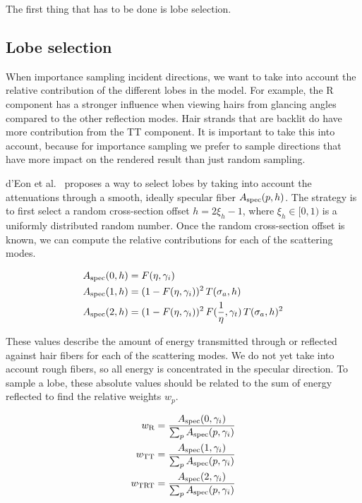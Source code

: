 \documentclass[11pt,a4paper]{report}
\begin{document}
The first thing that has to be done is lobe selection.

\subsection{Lobe selection}
\label{sec_lobe_selection}

When importance sampling incident directions, we want to take into account the relative contribution of the different lobes in the model. For example, the R component has a stronger influence when viewing hairs from glancing angles compared to the other reflection modes. Hair strands that are backlit do have more contribution from the TT component. It is important to take this into account, because for importance sampling we prefer to sample directions that have more impact on the rendered result than just random sampling.

d'Eon et al.~\cite{eon2013} proposes a way to select lobes by taking into account the attenuations through a smooth, ideally specular fiber $A_{\textnormal{spec}}(p, h)$. The strategy is to first select a random cross-section offset $h = 2\xi_h - 1$,  where $\xi_h \in [0, 1)$ is a uniformly distributed random number. Once the random cross-section offset is known, we can compute the relative contributions for each of the scattering modes.

\begin{align}
A_{\textnormal{spec}}(0, h) &= F(\eta, \gamma_i) \\
A_{\textnormal{spec}}(1, h) &= (1 - F(\eta, \gamma_i))^2 \, T(\sigma_a, h) \\
A_{\textnormal{spec}}(2, h) &= (1 - F(\eta, \gamma_i))^2 \, F(\frac{1}{\eta}, \gamma_t) \, T(\sigma_a, h)^2
\end{align}

These values describe the amount of energy transmitted through or reflected against hair fibers for each of the scattering modes. We do not yet take into account rough fibers, so all energy is concentrated in the specular direction. To sample a lobe, these absolute values should be related to the sum of energy reflected to find the relative weights $w_p$.

\begin{align}
w_{\textnormal{R}} &= \frac{A_{\textnormal{spec}}(0, \gamma_i)}{\sum_p A_{\textnormal{spec}}(p, \gamma_i)} \\
w_{\textnormal{TT}} &= \frac{A_{\textnormal{spec}}(1, \gamma_i)}{\sum_p A_{\textnormal{spec}}(p, \gamma_i)} \\
w_{\textnormal{TRT}} &= \frac{A_{\textnormal{spec}}(2, \gamma_i)}{\sum_p A_{\textnormal{spec}}(p, \gamma_i)}
\end{align}
\end{document}
